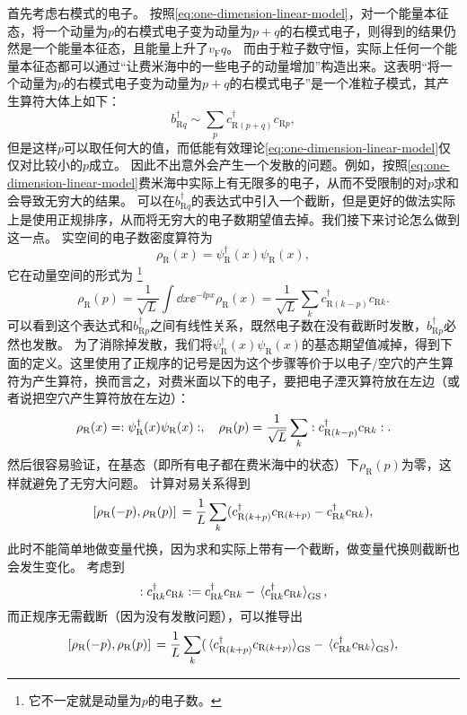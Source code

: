 首先考虑右模式的电子。
按照\eqref{eq:one-dimension-linear-model}，对一个能量本征态，将一个动量为$p$的右模式电子变为动量为$p+q$的右模式电子，则得到的结果仍然是一个能量本征态，且能量上升了$v_\text{F} q$。
而由于粒子数守恒，实际上任何一个能量本征态都可以通过“让费米海中的一些电子的动量增加”构造出来。这表明“将一个动量为$p$的右模式电子变为动量为$p+q$的右模式电子”是一个准粒子模式，其产生算符大体上如下：
\[
    {b}_{\text{R} q}^\dagger \sim \sum_p {c}^\dagger_{\text{R} (p+q)} {c}_{\text{R} p} ,
\]
但是这样$p$可以取任何大的值，而低能有效理论\eqref{eq:one-dimension-linear-model}仅仅对比较小的$p$成立。
因此不出意外会产生一个发散的问题。例如，按照\eqref{eq:one-dimension-linear-model}费米海中实际上有无限多的电子，从而不受限制的对$p$求和会导致无穷大的结果。
可以在${b}_{\text{R} q}^\dagger$的表达式中引入一个截断，但是更好的做法实际上是使用正规排序，从而将无穷大的电子数期望值去掉。我们接下来讨论怎么做到这一点。
实空间的电子数密度算符为
\[
    {\rho}_\text{R}(x) = {\psi}_\text{R}^\dagger(x) {\psi}_\text{R}(x),
\]
它在动量空间的形式为%
\footnote{它不一定就是动量为$p$的电子数。}%
\[
    {\rho}_\text{R}(p) = \frac{1}{\sqrt{L}} \int \dd{x} \ee^{-\ii p x} {\rho}_\text{R}(x) = \frac{1}{\sqrt{L}} \sum_k {c}^\dagger_{\text{R} (k - p)} {c}_{\text{R} k}.
\]
可以看到这个表达式和${b}^\dagger_{\text{R} p}$之间有线性关系，既然电子数在没有截断时发散，${b}^\dagger_{\text{R} p}$必然也发散。
为了消除掉发散，我们将${\psi}_\text{R}^\dagger(x) {\psi}_\text{R}(x)$的基态期望值减掉，得到下面的定义。这里使用了正规序的记号是因为这个步骤等价于以电子/空穴的产生算符为产生算符，换而言之，对费米面以下的电子，要把电子湮灭算符放在左边（或者说把空穴产生算符放在左边）：
\begin{equation}
    {\rho}_\text{R}(x) = : {\psi}_\text{R}^\dagger(x) {\psi}_\text{R}(x) :, \quad {\rho}_\text{R}(p) = \frac{1}{\sqrt{L}} \sum_k : {c}^\dagger_{\text{R} (k - p)} {c}_{\text{R} k} :.
\end{equation}
然后很容易验证，在基态（即所有电子都在费米海中的状态）下${\rho}_\text{R}(p)$为零，这样就避免了无穷大问题。
计算对易关系得到
\[
    \comm*{{\rho}_\text{R}(- p)}{{\rho}_\text{R}(p)} = \frac{1}{L} \sum_{k} ({c}^\dagger_{\text{R} (k + p)} {c}_{\text{R} (k + p)} - {c}^\dagger_{\text{R} k} {c}_{\text{R} k}),
\]
此时不能简单地做变量代换，因为求和实际上带有一个截断，做变量代换则截断也会发生变化。
考虑到
\[
    : {c}^\dagger_{\text{R} k} {c}_{\text{R} k} : = {c}^\dagger_{\text{R} k} {c}_{\text{R} k} - \expval*{{c}^\dagger_{\text{R} k} {c}_{\text{R} k}}_\text{GS},
\]
而正规序无需截断（因为没有发散问题），可以推导出
\[
    \comm*{{\rho}_\text{R}(- p)}{{\rho}_\text{R}(p)} = \frac{1}{L} \sum_{k} (\expval*{{c}^\dagger_{\text{R} (k + p)} {c}_{\text{R} (k + p)}}_\text{GS} - \expval*{{c}^\dagger_{\text{R} k} {c}_{\text{R} k}}_\text{GS}),
\]
